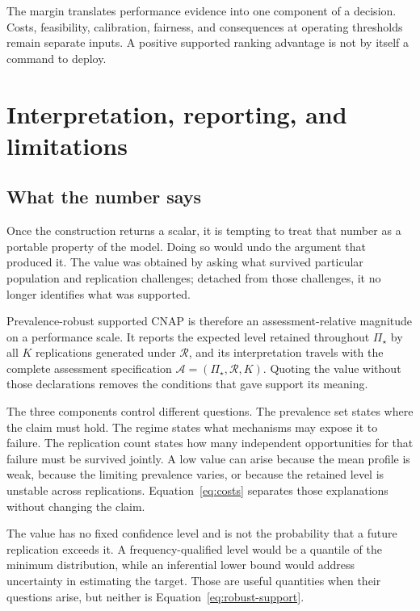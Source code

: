 \documentclass[11pt]{article}
\newcommand{\Regime}{\mathcal{R}}
\newcommand{\Assess}{\mathcal{A}}
\newcommand{\PSet}{\Pi_\star}
\theoremstyle{remark}
\begin{document}
The margin translates performance evidence into one component of a decision. Costs, feasibility, calibration, fairness, and consequences at operating thresholds remain separate inputs. A positive supported ranking advantage is not by itself a command to deploy.

\section{Interpretation, reporting, and limitations}
\label{sec:discussion}

\subsection{What the number says}

Once the construction returns a scalar, it is tempting to treat that number as a portable property of the model. Doing so would undo the argument that produced it. The value was obtained by asking what survived particular population and replication challenges; detached from those challenges, it no longer identifies what was supported.

Prevalence-robust supported CNAP is therefore an assessment-relative magnitude on a performance scale. It reports the expected level retained throughout $\PSet$ by all $K$ replications generated under $\Regime$, and its interpretation travels with the complete assessment specification $\Assess=(\PSet,\Regime,K)$. Quoting the value without those declarations removes the conditions that gave support its meaning.

The three components control different questions. The prevalence set states where the claim must hold. The regime states what mechanisms may expose it to failure. The replication count states how many independent opportunities for that failure must be survived jointly. A low value can arise because the mean profile is weak, because the limiting prevalence varies, or because the retained level is unstable across replications. Equation~\eqref{eq:costs} separates those explanations without changing the claim.

The value has no fixed confidence level and is not the probability that a future replication exceeds it. A frequency-qualified level would be a quantile of the minimum distribution, while an inferential lower bound would address uncertainty in estimating the target. Those are useful quantities when their questions arise, but neither is Equation~\eqref{eq:robust-support}.
\end{document}

